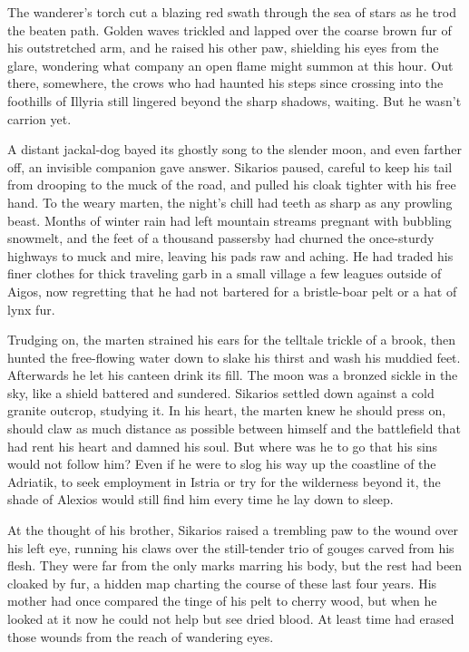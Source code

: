 The wanderer's torch cut a blazing red swath through the sea of stars as he trod the beaten path. Golden waves trickled and lapped over the coarse brown fur of his outstretched arm, and he raised his other paw, shielding his eyes from the glare, wondering what company an open flame might summon at this hour. Out there, somewhere, the crows who had haunted his steps since crossing into the foothills of Illyria still lingered beyond the sharp shadows, waiting. But he wasn't carrion yet.

A distant jackal-dog bayed its ghostly song to the slender moon, and even farther off, an invisible companion gave answer. Sikarios paused, careful to keep his tail from drooping to the muck of the road, and pulled his cloak tighter with his free hand. To the weary marten, the night's chill had teeth as sharp as any prowling beast. Months of winter rain had left mountain streams pregnant with bubbling snowmelt, and the feet of a thousand passersby had churned the once-sturdy highways to muck and mire, leaving his pads raw and aching. He had traded his finer clothes for thick traveling garb in a small village a few leagues outside of Aigos, now regretting that he had not bartered for a bristle-boar pelt or a hat of lynx fur.

Trudging on, the marten strained his ears for the telltale trickle of a brook, then hunted the free-flowing water down to slake his thirst and wash his muddied feet. Afterwards he let his canteen drink its fill. The moon was a bronzed sickle in the sky, like a shield battered and sundered. Sikarios settled down against a cold granite outcrop, studying it. In his heart, the marten knew he should press on, should claw as much distance as possible between himself and the battlefield that had rent his heart and damned his soul. But where was he to go that his sins would not follow him? Even if he were to slog his way up the coastline of the Adriatik, to seek employment in Istria or try for the wilderness beyond it, the shade of Alexios would still find him every time he lay down to sleep.

At the thought of his brother, Sikarios raised a trembling paw to the wound over his left eye, running his claws over the still-tender trio of gouges carved from his flesh. They were far from the only marks marring his body, but the rest had been cloaked by fur, a hidden map charting the course of these last four years. His mother had once compared the tinge of his pelt to cherry wood, but when he looked at it now he could not help but see dried blood. At least time had erased those wounds from the reach of wandering eyes.

